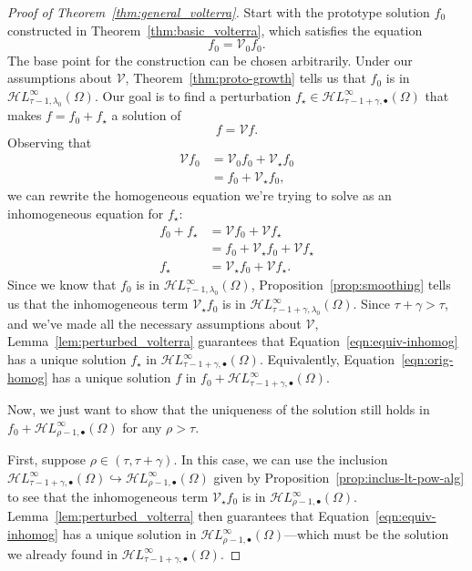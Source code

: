 \documentclass{article}
\theoremstyle{plain}
\newcommand{\singexp}[2]{\mathcal{H}L^\infty_{#1, #2}}
\newcommand{\singexpalg}[1]{\singexp{#1}{\bullet}}
\newcommand{\volterra}{\mathcal{V}}
\newcommand{\hardpart}{\mathcal{V}_0}
\newcommand{\softpart}{\mathcal{V}_\star}
\newcommand{\hardker}{k_0}
\newcommand{\solwhole}{f}
\newcommand{\solproto}{f_0}
\newcommand{\solptb}{f_\star}
\begin{document}
\begin{proof}[Proof of Theorem~\ref{thm:general_volterra}]
Start with the prototype solution $\solproto$ constructed in Theorem~\ref{thm:basic_volterra}, which satisfies the equation
\[ \solproto = \hardpart \solproto. \]
The base point for the construction can be chosen arbitrarily. Under our assumptions about $\volterra$, Theorem~\ref{thm:proto-growth} tells us that $\solproto$ is in $\singexp{\tau-1}{\lambda_0}(\Omega)$. Our goal is to find a perturbation $\solptb \in \singexpalg{\tau-1+\gamma}(\Omega)$ that makes $\solwhole = \solproto + \solptb$ a solution of
\begin{equation}\label{eqn:orig-homog}
\solwhole = \volterra \solwhole.
\end{equation}
Observing that
\begin{align*}
\volterra \solproto & = \hardpart\solproto + \softpart\solproto \\
& = \solproto + \softpart \solproto,
\end{align*}
we can rewrite the homogeneous equation we're trying to solve as an inhomogeneous equation for $\solptb$:
\begin{align}
\solproto + \solptb & = \volterra\solproto + \volterra\solptb \nonumber \\
& = \solproto + \softpart\solproto + \volterra\solptb \nonumber \\
\solptb & = \softpart\solproto + \volterra\solptb. \label{eqn:equiv-inhomog}
\end{align}
Since we know that $\solproto$ is in $\singexp{\tau-1}{\lambda_0}(\Omega)$, Proposition~\ref{prop:smoothing} tells us that the inhomogeneous term $\softpart\solproto$ is in $\singexp{\tau-1+\gamma}{\lambda_0}(\Omega)$. Since $\tau+\gamma > \tau$, and we've made all the necessary assumptions about $\volterra$, Lemma~\ref{lem:perturbed_volterra} guarantees that Equation~\eqref{eqn:equiv-inhomog} has a unique solution $\solptb$ in $\singexpalg{\tau-1+\gamma}(\Omega)$. Equivalently, Equation~\eqref{eqn:orig-homog} has a unique solution $f$ in $f_0 + \singexpalg{\tau-1+\gamma}(\Omega)$.

Now, we just want to show that the uniqueness of the solution still holds in $f_0 + \singexpalg{\rho-1}(\Omega)$ for any $\rho > \tau$.

First, suppose $\rho \in (\tau, \tau+\gamma)$. In this case, we can use the inclusion $\singexpalg{\tau-1+\gamma}(\Omega) \hookrightarrow \singexpalg{\rho-1}(\Omega)$ given by Proposition~\ref{prop:inclus-lt-pow-alg} to see that the inhomogeneous term $\softpart\solproto$ is in $\singexpalg{\rho-1}(\Omega)$. Lemma~\ref{lem:perturbed_volterra} then guarantees that Equation~\eqref{eqn:equiv-inhomog} has a unique solution in $\singexpalg{\rho-1}(\Omega)$---which must be the solution we already found in $\singexpalg{\tau-1+\gamma}(\Omega)$.


\end{proof}
\end{document}

